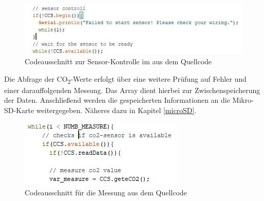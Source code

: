 \begin{figure}[!hbt]
	\centering
	\includegraphics[width=0.8\linewidth]{Images/ccs811Setup}
	\caption{Codeausschnitt zur Sensor-Kontrolle im aus dem Quellcode}
	\label{fig:Setup}
\end{figure}

Die Abfrage der CO\textsubscript{2}-Werte erfolgt über eine weitere Prüfung auf Fehler und einer darauffolgenden Messung. Das Array dient hierbei zur Zwischenspeicherung der Daten. Anschließend werden die gespeicherten Informationen an die Mikro-SD-Karte weitergegeben. Näheres dazu in Kapitel \ref{microSD}.

\begin{figure}[!hbt]
	\centering
	\includegraphics[width=0.5\linewidth]{Images/ccs811Loop}
	\caption{Codeausschnitt für die Messung aus dem Quellcode}
	\label{fig:Loop}
\end{figure}

